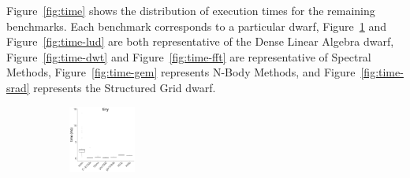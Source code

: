 \documentclass[../document.tex]{subfiles}
\begin{document}
Figure~\ref{fig:time} shows the distribution of execution times for the remaining benchmarks.
Each benchmark corresponds to a particular dwarf, Figure~\ref{fig:time-kmeans} and Figure~\ref{fig:time-lud} are both representative of the Dense Linear Algebra dwarf, Figure~\ref{fig:time-dwt} and Figure~\ref{fig:time-fft} are representative of Spectral Methods,
Figure~\ref{fig:time-gem} represents N-Body Methods, and Figure~\ref{fig:time-srad} represents the Structured Grid dwarf.

\captionsetup[subfigure]{justification=raggedright,singlelinecheck=false}

\newcommand{\plotwidth}{0.24\textwidth}
\begin{figure}
	\begin{subfigure}{0.09\textwidth} \label{fig:time-kmeans} \vspace{5mm}\end{subfigure}
	\begin{subfigure}{0.9\textwidth}
		\includegraphics[width=\plotwidth]{figures/time-results/generate_kmeans_no_knl_tiny_boxplot-1}

\end{subfigure}
\end{figure}
\end{document}
